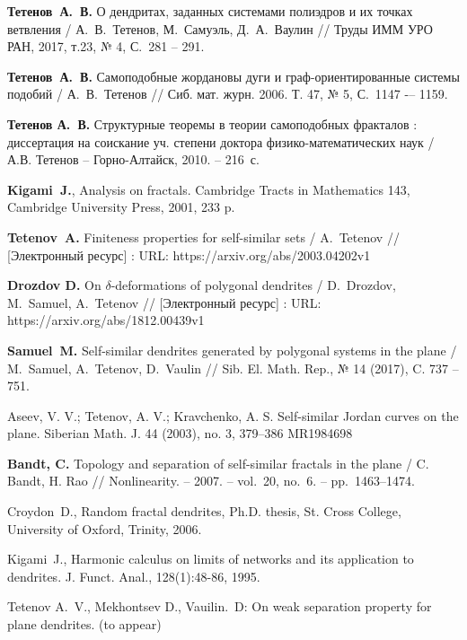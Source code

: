 \begin{thebibliography}{99}
{\bf Тетенов~А.~В.}  
О дендритах, заданных системами полиэдров и их точках ветвления /
А.~В.~Тетенов, М.~Самуэль, Д.~А.~Ваулин // 
Труды ИММ УРО РАН, 2017, т.23, № 4, С.~281 -- 291.

{\bf Тетенов~А.~В.}
Самоподобные жордановы дуги и граф-ориентированные системы подобий /
А.~В.~Тетенов //
Сиб. мат. журн. 2006. Т. 47, № 5, С.~1147 -– 1159.

{\bf Тетенов А.~В.} 
Структурные теоремы в теории самоподобных фракталов : диссертация на соискание уч. степени доктора физико-математических наук / А.В. Тетенов -- Горно-Алтайск, 2010. -- 216~с. 

{\bf Kigami~J.}, 
Analysis on fractals. Cambridge Tracts in Mathematics 143, 
Cambridge University Press, 2001, 233 p.

{\bf Tetenov~A.}
Finiteness properties for self-similar sets /
A.~Tetenov //
[Электронный ресурс] : URL: https://arxiv.org/abs/2003.04202v1

{\bf Drozdov D.}
On $\delta$-deformations of polygonal dendrites /
D.~Drozdov, M.~Samuel, A.~Tetenov //
[Электронный ресурс] : URL: https://arxiv.org/abs/1812.00439v1

{\bf Samuel~M.}
 Self-similar dendrites generated by polygonal systems in the plane /
 M.~Samuel, A.~Tetenov, D.~Vaulin // 
Sib. El. Math. Rep., № 14 (2017), C. 737 -- 751. 


 Aseev, V. V.; Tetenov, A. V.; Kravchenko, A. S. Self-similar Jordan curves on
the plane.  Siberian Math. J. 44 (2003), no. 3, 379--386 MR1984698

  {\bf Bandt, C.} Topology and separation of self-similar fractals in the plane / C. Bandt, H. Rao // Nonlinearity. -- 2007. -- vol.~20, no.~6. -- pp.~1463--1474.


 Croydon~D., Random fractal dendrites, Ph.D. thesis, St. Cross College, University of Oxford, Trinity, 2006.


 Kigami~J., Harmonic calculus on limits of networks and its application to dendrites. J. Funct. Anal., 128(1):48-86, 1995.




Tetenov A.~V., Mekhontsev D., Vauilin.~D: On weak separation property for plane dendrites. 	(to appear)


\end{thebibliography}
